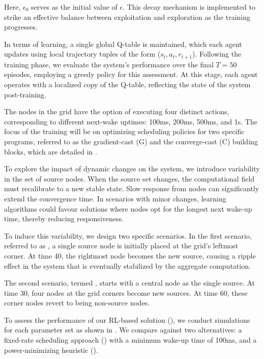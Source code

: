 Here, $\epsilon_0$ serves as the initial value of $\epsilon$. 
 This decay mechanism is implemented to strike an effective balance between exploitation and exploration as the training progresses.

In terms of learning, 
 a single global Q-table is maintained, 
 which each agent updates using local trajectory tuples of the form ($s_t, a_t, r_{t+1}$). 
 Following the training phase, we evaluate the system's performance over the final $T=50$ episodes, 
 employing a greedy policy for this assessment. 
 At this stage, each agent operates with a localized copy of the Q-table, reflecting the state of the system post-training.

The nodes in the grid have the option of executing four distinct actions, corresponding to different next-wake uptimes: 
 100ms, 200ms, 500ms, and 1s. 
 The focus of the training will be on optimizing scheduling policies for two specific programs, 
 referred to as the gradient-cast (G) and the converge-cast (C) building blocks, which are detailed in .

To explore the impact of dynamic changes on the system, 
 we introduce variability in the set of source nodes. 
 When the source set changes, the computational field must recalibrate to a new stable state. 
 Slow response from nodes can significantly extend the convergence time. 
 In scenarios with minor changes, 
 learning algorithms could favour solutions where nodes opt for the longest next wake-up time, thereby reducing responsiveness.

 To induce this variability, 
 we design two specific scenarios. 
 In the first scenario, referred to as \swapscen{}, a single source node is initially placed at the grid's leftmost corner. At time 40, the rightmost node becomes the new source, causing a ripple effect in the system that is eventually stabilized by the aggregate computation.
 
The second scenario, termed \multiswap{}, 
 starts with a central node as the single source. 
 At time 30, four nodes at the grid corners become new sources. 
 At time 60, these corner nodes revert to being non-source nodes.
 
To assess the performance of our RL-based solution (\rlsol{}), 
 we conduct simulations for each parameter set as shown in . 
 We compare \rlsol{} against two alternatives: a fixed-rate scheduling approach (\periodicsol{}) with a minimum wake-up time of 100ms, and a power-minimizing heuristic (\adhocsol{}).
 
